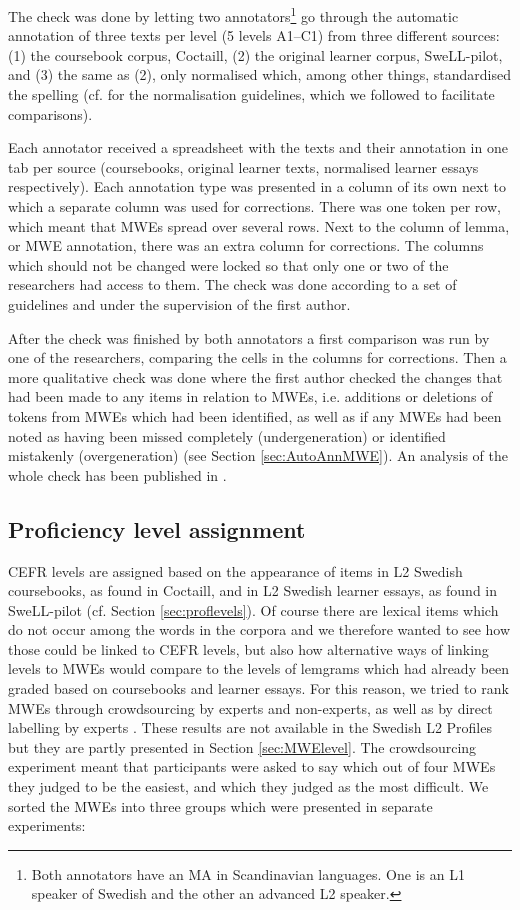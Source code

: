 \documentclass[output=paper,colorlinks,citecolor=brown]{langscibook}
\begin{document}
The check was done by letting two annotators\footnote{Both annotators have an MA in Scandinavian languages. One is an L1 speaker of Swedish and the other an advanced L2 speaker.} go through the automatic annotation of three texts per level (5 levels A1–C1) from three different sources: (1) the coursebook corpus, Coctaill, (2) the original learner corpus, SweLL-pilot, and (3) the same as (2), only normalised which, among other things, standardised the spelling (cf. \cite{rudebeck2021swell} for the normalisation guidelines, which we followed to facilitate comparisons). 

Each annotator received a spreadsheet with the texts and their annotation in one tab per source (coursebooks, original learner texts, normalised learner essays respectively). Each annotation type was presented in a column of its own next to which a separate column was used for corrections. There was one token per row, which meant that MWEs spread over several rows. Next to the column of lemma, or MWE annotation, there was an extra column for corrections. The columns which should not be changed were locked so that only one or two of the researchers had access to them. The check was done according to a set of guidelines and under the supervision of the first author.

After the check was finished by both annotators a first comparison was run by one of the researchers, comparing the cells in the columns for corrections. Then a more qualitative check was done where the first author checked the changes that had been made to any items in relation to MWEs, i.e. additions or deletions of tokens from MWEs which had been identified, as well as if any MWEs had been noted as having been missed completely (undergeneration) or identified mistakenly (overgeneration) (see Section \ref{sec:AutoAnnMWE}). An analysis of the whole check has been published in \citet{volodina2022annotation}. 

\subsection{Proficiency level assignment} \label{sec:Proficiency}
CEFR levels are assigned based on the appearance of items in L2 Swedish coursebooks, as found in Coctaill, and in L2 Swedish learner essays, as found in SweLL-pilot (cf. Section \ref{sec:proflevels}).
Of course there are lexical items which do not occur among the words in the corpora and we therefore wanted to see how those could be linked to CEFR levels, but also how alternative ways of linking levels to MWEs would compare to the levels of lemgrams which had already been graded based on coursebooks and learner essays. For this reason, we tried to rank MWEs through crowdsourcing by experts and non-experts, as well as by direct labelling by experts \citep{alfter2021mwe}. These results are not available in the Swedish L2 Profiles but they are partly presented in Section \ref{sec:MWElevel}. 
The crowdsourcing experiment meant that participants were asked to say  
which out of four MWEs they judged to be the easiest, and which they judged as the most difficult. We sorted the MWEs into three groups which were presented in separate experiments: 
\end{document}
